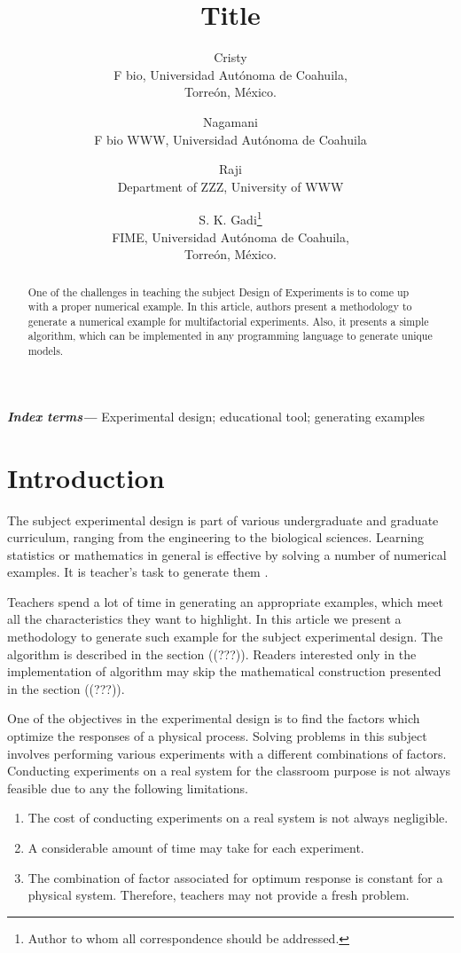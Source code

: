 \documentclass[letterpaper, 12pt]{article}
\title{\bf Title}
\author{Cristy\\ F bio, Universidad Autónoma de Coahuila,\\ Torreón, México.
	\and
	Nagamani \\
	F bio WWW, Universidad Autónoma de Coahuila
	\and
	Raji \\
	Department of ZZZ, University of WWW
	\and
	S. K. Gadi\thanks{Author to whom all correspondence should be addressed.} \\
	FIME, Universidad Autónoma de Coahuila,\\ Torreón, México.
}
\providecommand{\keywords}[1]{\textbf{\textit{Index terms---}} #1}
\begin{document}
	\maketitle
	\begin{abstract}
		One of the challenges in teaching the subject Design of Experiments is to come up with a proper numerical example. In this article, authors present a methodology to generate a numerical example for multifactorial experiments. Also, it presents a simple algorithm, which can be implemented in any programming language to generate unique models.
	\end{abstract}
	\keywords{Experimental design; educational tool; generating examples}
	\section{Introduction}
	The subject experimental design is part of various undergraduate and graduate curriculum, ranging from the engineering to the biological sciences. Learning statistics or mathematics in general is effective by solving a number of numerical examples. It is teacher's task to generate them \cite{Deborah2008}.
	\par
	Teachers spend a lot of time in generating an appropriate examples, which meet all the characteristics they want to highlight. In this article we present a methodology to generate such example for the subject experimental design. The algorithm is described in the section ((???)). Readers interested only in the implementation of algorithm may skip the mathematical construction presented in the section ((???)).
	\par
	One of the objectives in the experimental design is to find the factors which optimize the responses of a physical process. Solving problems in this subject involves performing various experiments with a different combinations of factors. Conducting experiments on a real system for the classroom purpose is not always feasible due to any the following limitations.
	\begin{enumerate}
		\item The cost of conducting experiments on a real system is not always negligible.
		\item A considerable amount of time may take for each experiment.
		\item The combination of factor associated for optimum response is constant for a physical system. Therefore, teachers may not provide a fresh problem.
	\end{enumerate}
\end{document}
